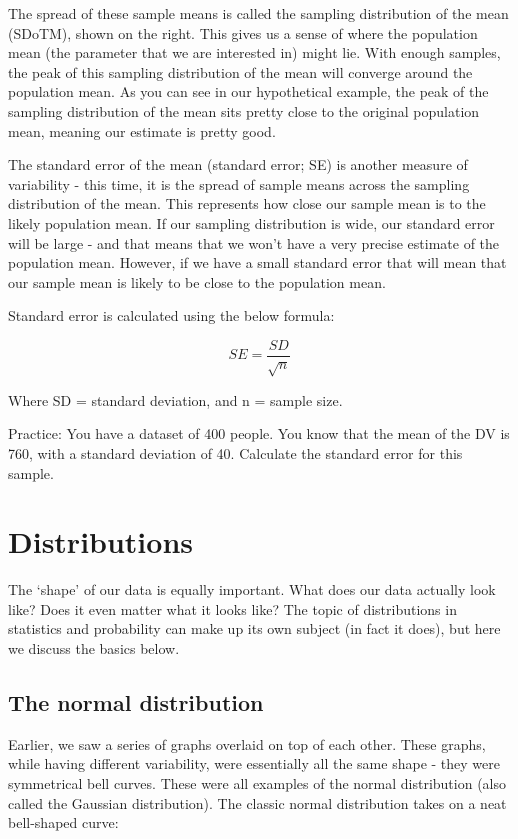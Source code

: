 \documentclass[
]{book}
\begin{document}
The spread of these sample means is called the sampling distribution of the mean (SDoTM), shown on the right. This gives us a sense of where the population mean (the parameter that we are interested in) might lie. With enough samples, the peak of this sampling distribution of the mean will converge around the population mean. As you can see in our hypothetical example, the peak of the sampling distribution of the mean sits pretty close to the original population mean, meaning our estimate is pretty good.

The standard error of the mean (standard error; SE) is another measure of variability - this time, it is the spread of sample means across the sampling distribution of the mean. This represents how close our sample mean is to the likely population mean. If our sampling distribution is wide, our standard error will be large - and that means that we won't have a very precise estimate of the population mean. However, if we have a small standard error that will mean that our sample mean is likely to be close to the population mean.

Standard error is calculated using the below formula:

\[
SE = \frac{SD}{\sqrt n}
\]

Where SD = standard deviation, and n = sample size.

Practice: You have a dataset of 400 people. You know that the mean of the DV is 760, with a standard deviation of 40. Calculate the standard error for this sample.

\hypertarget{distributions}{%
\section{Distributions}\label{distributions}}

The `shape' of our data is equally important. What does our data actually look like? Does it even matter what it looks like? The topic of distributions in statistics and probability can make up its own subject (in fact it does), but here we discuss the basics below.

\hypertarget{the-normal-distribution}{%
\subsection{The normal distribution}\label{the-normal-distribution}}

Earlier, we saw a series of graphs overlaid on top of each other. These graphs, while having different variability, were essentially all the same shape - they were symmetrical bell curves. These were all examples of the normal distribution (also called the Gaussian distribution). The classic normal distribution takes on a neat bell-shaped curve:
\end{document}
